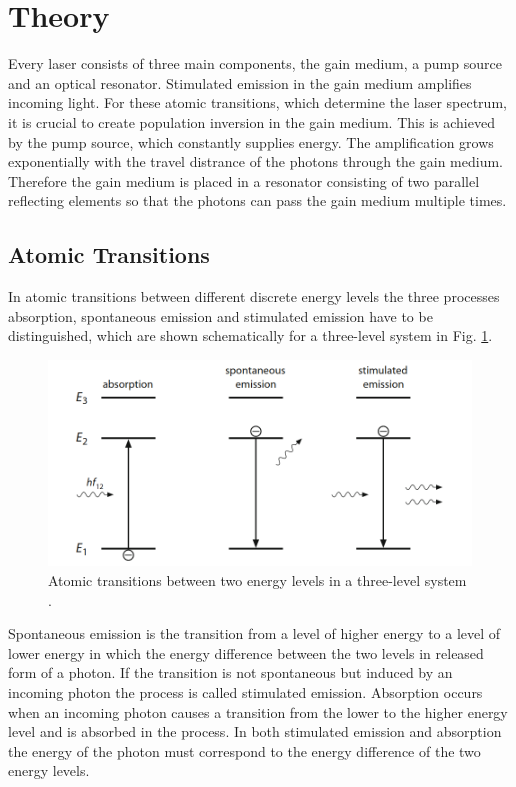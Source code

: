 \section{Theory}
Every laser consists of three main components, the gain medium, a pump source
and an optical resonator. 
Stimulated emission in the gain medium amplifies incoming light. For these atomic transitions,
which determine the laser spectrum, it is crucial to create population inversion in the 
gain medium. This is achieved by the pump source, which constantly supplies energy.
The amplification grows exponentially with the travel distrance of the photons through 
the gain medium. Therefore the gain medium is placed in a resonator consisting of two 
parallel reflecting elements so that the photons can pass the gain medium multiple times.

\subsection*{Atomic Transitions}
In atomic transitions between different discrete energy levels the three processes 
absorption, spontaneous emission and stimulated emission have to be distinguished, which are
shown schematically for a three-level system in Fig. \ref{fig:transitions}.
\begin{figure}
    \centering
    \includegraphics[width = 0.8\linewidth]{Bilder/transitions.png}
    \caption{Atomic transitions between two energy levels in a three-level system \cite{eichler}.}
    \label{fig:transitions}
\end{figure}
Spontaneous emission is the transition from a level of higher energy to a level of lower 
energy in which the energy difference between the two levels in released form of a photon.
If the transition is not spontaneous but induced by an incoming photon the process is 
called stimulated emission. 
Absorption occurs when an incoming photon causes a transition 
from the lower to the higher energy level and is absorbed in the process. 
In both stimulated emission and absorption the energy of the photon must correspond to the energy 
difference of the two energy levels.

